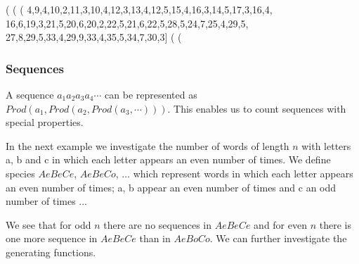 \documentclass[11pt]{article}
\begin{document}
\begin{example}
(%
(%
(%
        4,9,4,10,2,11,3,10,4,12,3,13,4,12,5,15,4,16,3,14,5,17,3,16,4,
        16,6,19,3,21,5,20,6,20,2,22,5,21,6,22,5,28,5,24,7,25,4,29,5,
        27,8,29,5,33,4,29,9,33,4,35,5,34,7,30,3]
(%
(%
\end{example}

\subsubsection{Sequences}

A sequence $a_1a_2a_3a_4\cdots$ can be represented as $Prod(a_1,
Prod(a_2, Prod(a_3, \cdots )))$. This enables us to count sequences
with special properties.

In the next example we investigate the number of words of length $n$
with letters a, b and c in which each letter appears an even number of
times. We define species $AeBeCe$, $AeBeCo$, $\ldots$ which represent
words in which each letter appears an even number of times; a, b
appear an even number of times and c an odd number of times $\ldots$

%
We see that for odd $n$ there are no sequences in $AeBeCe$ and for
even $n$ there is one more sequence in $AeBeCe$ than in $AeBoCo$. We
can further investigate the generating functions.
\end{document}
